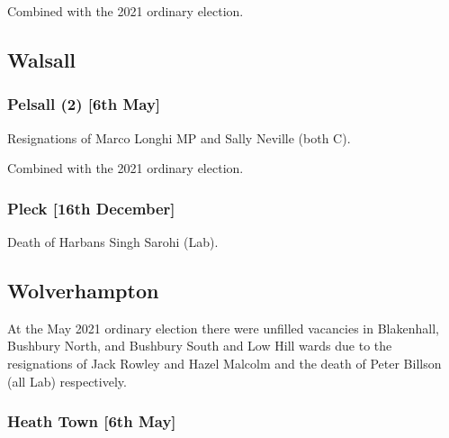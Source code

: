 \documentclass[a4paper,openany]{book}
\begin{document}
\begin{resultsiii}
Combined with the 2021 ordinary election.

\subsection*{Walsall}

\subsubsection*{Pelsall (2) \hspace*{\fill}\nolinebreak[1]%
	\enspace\hspace*{\fill}
	[6th May]}


Resignations of Marco Longhi MP and Sally Neville (both C).

Combined with the 2021 ordinary election.

\subsubsection*{Pleck \hspace*{\fill}\nolinebreak[1]%
	\enspace\hspace*{\fill}
	[16th December]}


Death of Harbans Singh Sarohi (Lab).

\subsection*{Wolverhampton}

At the May 2021 ordinary election there were unfilled vacancies in Blakenhall, Bushbury North, and Bushbury South and Low Hill wards due to the resignations of Jack Rowley and Hazel Malcolm and the death of Peter Billson (all Lab) respectively.

\subsubsection*{Heath Town \hspace*{\fill}\nolinebreak[1]%
	\enspace\hspace*{\fill}
	[6th May]}


\end{resultsiii}
\end{document}
